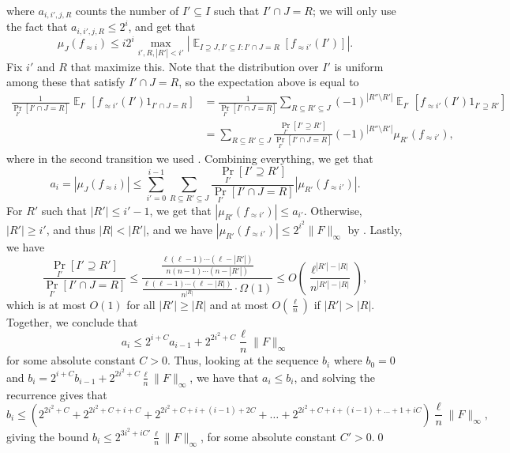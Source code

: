\documentclass{toc}
\newcommand\card[1]{\left| {#1} \right|}
\newcommand\Prob[2]{{\Pr_{#1}\left[ {#2} \right]}}
\newcommand\Expect[2]{{\mathop{\mathbb{E}}_{#1}\left[ {#2} \right]}}
\newcommand\norm[1]{\| #1 \|}
\renewcommand\geq{\geqslant}
\renewcommand\leq{\leqslant}
\newcommand\approxlvlfn[2]{{#1}_{\approx{#2}}}
\begin{document}
where $a_{i,i',j,R}$ counts the number of $I'\subseteq I$ such that $I'\cap J = R$; we will only use the fact that
$a_{i,i',j,R}\leq 2^i$, and get that
\[
\mu_J(\approxlvlfn{f}{i})
\leq i2^{i}\max_{i',R, \card{R'}<i'}\card{\Expect{I\supseteq J, I'\subseteq I: I'\cap J = R}{\approxlvlfn{f}{i'}(I')}}.
\]
Fix $i'$ and $R$ that maximize this. Note that the distribution over $I'$ is uniform among these that satisfy $I'\cap J = R$, so
the expectation above is equal to
\begin{align*}
\frac{1}{\Prob{I'}{I'\cap J = R}}\Expect{I'}{\approxlvlfn{f}{i'}(I')1_{I'\cap J = R}}
&=\frac{1}{\Prob{I'}{I'\cap J = R}}\sum\limits_{R\subseteq R'\subseteq J}
(-1)^{\card{R''\setminus R'}}\Expect{I'}{\approxlvlfn{f}{i'}(I')1_{I'\supseteq R'}}\\
&=\sum\limits_{R\subseteq R'\subseteq J}
\frac{\Prob{I'}{I'\supseteq R'}}{\Prob{I'}{I'\cap J = R}}
(-1)^{\card{R''\setminus R'}}\mu_{R'}(\approxlvlfn{f}{i'}),
\end{align*}
where in the second transition we used . Combining everything, we get that
\[
a_i
=\card{\mu_{J}(\approxlvlfn{f}{i})}
\leq
\sum\limits_{i'=0}^{i-1}\sum\limits_{R\subseteq R'\subseteq J}
\frac{\Prob{I'}{I'\supseteq R'}}{\Prob{I'}{I'\cap J = R}}
\card{\mu_{R'}(\approxlvlfn{f}{i'})}.
\]
For $R'$ such that $\card{R'}\leq i'-1$, we get that $\card{\mu_{R'}(\approxlvlfn{f}{i'})}\leq a_{i'}$.
Otherwise, $\card{R'}\geq i'$, and thus $\card{R}<\card{R'}$, and we have
$\card{\mu_{R'}(\approxlvlfn{f}{i'})}\leq 2^{i^2}\norm{F}_{\infty}$ by . Lastly, we have
\[
\frac{\Prob{I'}{I'\supseteq R'}}{\Prob{I'}{I'\cap J = R}}
\leq
\frac{\frac{\ell(\ell-1)\cdots(\ell-\card{R'})}{n(n-1)\cdots(n-\card{R'})}}{\frac{\ell(\ell-1)\cdots(\ell-\card{R})}{n^{\card{R}}} \cdot \Omega(1)}
\leq O\left(\frac{\ell^{\card{R'}-\card{R}}}{n^{\card{R'}-\card{R}}}\right),
\]
which is at most $O(1)$ for all $\card{R'}\geq \card{R}$ and at most $O\left(\frac{\ell}{n}\right)$ if $\card{R'}>\card{R}$.
Together, we conclude that
\[
a_i\leq 2^{i+C} a_{i-1} + 2^{2i^2+C} \frac{\ell}{n}\norm{F}_{\infty}
\]
for some absolute constant $C>0$. Thus, looking at the sequence $b_i$ where $b_0 = 0$
and $b_{i} = 2^{i+C}  b_{i-1} + 2^{2i^2+C} \frac{\ell}{n}\norm{F}_{\infty}$, we have that $a_i\leq b_i$,
and solving the recurrence gives that
\[
b_{i}\leq \left(2^{2i^2+C} + 2^{2i^2+C+i+C} + 2^{2i^2+C+i+(i-1)+2C}+\ldots + 2^{2i^2+C+i+(i-1)+\ldots+1+iC}\right)\frac{\ell}{n}\norm{F}_{\infty},
\]
giving the bound $b_i\leq 2^{3i^2 + iC'} \frac{\ell}{n}\norm{F}_{\infty}$, for some absolute constant $C'>0$.\qed
\end{document}
